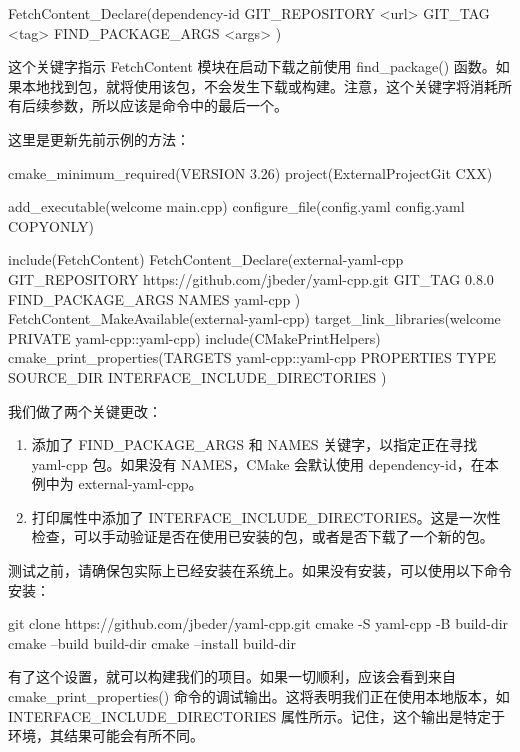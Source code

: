 \begin{shell}
FetchContent_Declare(dependency-id
                     GIT_REPOSITORY <url>
                     GIT_TAG <tag>
                     FIND_PACKAGE_ARGS <args>
)
\end{shell}

这个关键字指示 FetchContent 模块在启动下载之前使用 find\_package() 函数。如果本地找到包，就将使用该包，不会发生下载或构建。注意，这个关键字将消耗所有后续参数，所以应该是命令中的最后一个。

这里是更新先前示例的方法：


\begin{cmake}
cmake_minimum_required(VERSION 3.26)
project(ExternalProjectGit CXX)

add_executable(welcome main.cpp)
configure_file(config.yaml config.yaml COPYONLY)

include(FetchContent)
FetchContent_Declare(external-yaml-cpp
    GIT_REPOSITORY    https://github.com/jbeder/yaml-cpp.git
    GIT_TAG           0.8.0
    FIND_PACKAGE_ARGS NAMES yaml-cpp
)
FetchContent_MakeAvailable(external-yaml-cpp)
target_link_libraries(welcome PRIVATE yaml-cpp::yaml-cpp)
include(CMakePrintHelpers)
cmake_print_properties(TARGETS yaml-cpp::yaml-cpp
                       PROPERTIES TYPE SOURCE_DIR
                       INTERFACE_INCLUDE_DIRECTORIES
)
\end{cmake}

我们做了两个关键更改：

\begin{enumerate}
\item
添加了 FIND\_PACKAGE\_ARGS 和 NAMES 关键字，以指定正在寻找 yaml-cpp 包。如果没有 NAMES，CMake 会默认使用 dependency-id，在本例中为 external-yaml-cpp。

\item
打印属性中添加了 INTERFACE\_INCLUDE\_DIRECTORIES。这是一次性检查，可以手动验证是否在使用已安装的包，或者是否下载了一个新的包。
\end{enumerate}

测试之前，请确保包实际上已经安装在系统上。如果没有安装，可以使用以下命令安装：

\begin{shell}
git clone https://github.com/jbeder/yaml-cpp.git
cmake -S yaml-cpp -B build-dir
cmake --build build-dir
cmake --install build-dir
\end{shell}

有了这个设置，就可以构建我们的项目。如果一切顺利，应该会看到来自 cmake\_print\_properties() 命令的调试输出。这将表明我们正在使用本地版本，如 INTERFACE\_INCLUDE\_DIRECTORIES 属性所示。记住，这个输出是特定于环境，其结果可能会有所不同。

